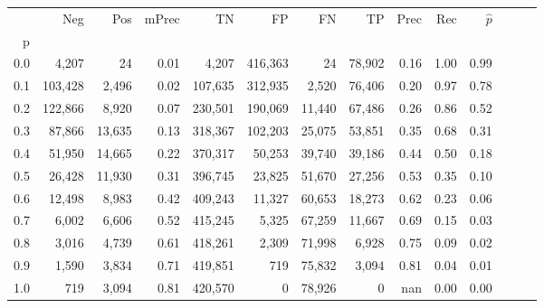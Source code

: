 \begin{tabular}{rrrrrrrrrrrrrr}
\toprule
{} &      Neg &     Pos & mPrec &       TN &       FP &      FN &      TP &  Prec &   Rec & $\hat{p}$ \\
p   &          &         &       &          &          &         &         &       &       &           \\
\midrule
0.0 &    4,207 &      24 &  0.01 &    4,207 &  416,363 &      24 &  78,902 &  0.16 &  1.00 &      0.99 \\
0.1 &  103,428 &   2,496 &  0.02 &  107,635 &  312,935 &   2,520 &  76,406 &  0.20 &  0.97 &      0.78 \\
0.2 &  122,866 &   8,920 &  0.07 &  230,501 &  190,069 &  11,440 &  67,486 &  0.26 &  0.86 &      0.52 \\
0.3 &   87,866 &  13,635 &  0.13 &  318,367 &  102,203 &  25,075 &  53,851 &  0.35 &  0.68 &      0.31 \\
0.4 &   51,950 &  14,665 &  0.22 &  370,317 &   50,253 &  39,740 &  39,186 &  0.44 &  0.50 &      0.18 \\
0.5 &   26,428 &  11,930 &  0.31 &  396,745 &   23,825 &  51,670 &  27,256 &  0.53 &  0.35 &      0.10 \\
0.6 &   12,498 &   8,983 &  0.42 &  409,243 &   11,327 &  60,653 &  18,273 &  0.62 &  0.23 &      0.06 \\
0.7 &    6,002 &   6,606 &  0.52 &  415,245 &    5,325 &  67,259 &  11,667 &  0.69 &  0.15 &      0.03 \\
0.8 &    3,016 &   4,739 &  0.61 &  418,261 &    2,309 &  71,998 &   6,928 &  0.75 &  0.09 &      0.02 \\
0.9 &    1,590 &   3,834 &  0.71 &  419,851 &      719 &  75,832 &   3,094 &  0.81 &  0.04 &      0.01 \\
1.0 &      719 &   3,094 &  0.81 &  420,570 &        0 &  78,926 &       0 &   nan &  0.00 &      0.00 \\
\bottomrule
\end{tabular}
